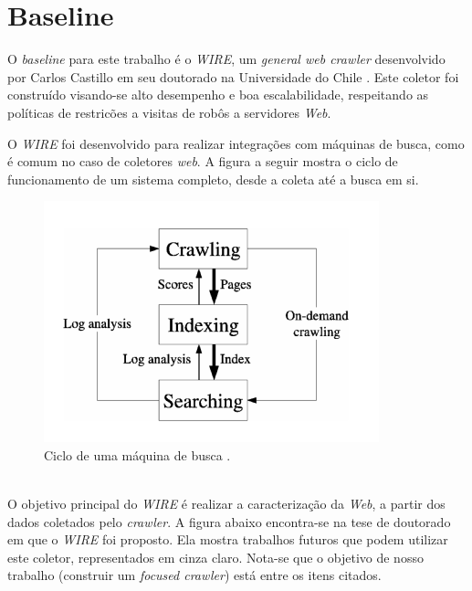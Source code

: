 \documentclass[a4paper,12pt,titlepage]{article}
\begin{document}
\section{Baseline}

O \textit{baseline} para este trabalho é o \textit{WIRE}, um \textit{general web crawler} desenvolvido por Carlos Castillo em seu doutorado na Universidade do Chile \cite{carlos}. Este coletor foi construído visando-se alto desempenho e boa escalabilidade, respeitando as políticas de restricões a visitas de robôs a servidores \textit{Web}.

O \textit{WIRE} foi desenvolvido para realizar integrações com máquinas de busca, como é comum no caso de coletores \textit{web}. A figura a seguir mostra o ciclo de funcionamento de um sistema completo, desde a coleta até a busca em si.

\begin{figure}[H]
     \centering
     \includegraphics[scale=0.2]{figures/search-engine-cycle.png}
     \caption{Ciclo de uma máquina de busca \cite{carlos}.}
     \label{bsp}
\end{figure}

\ \\

O objetivo principal do \textit{WIRE} é realizar a caracterização da \textit{Web}, a partir dos dados coletados pelo \textit{crawler}. A figura abaixo encontra-se na tese de doutorado em que o \textit{WIRE} foi proposto. Ela mostra trabalhos futuros que podem utilizar este coletor, representados em cinza claro. Nota-se que o objetivo de nosso trabalho (construir um \textit{focused crawler}) está entre os itens citados.
\end{document}
